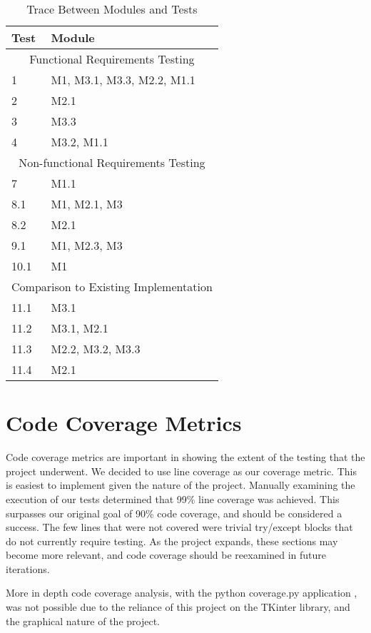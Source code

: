 \documentclass[12pt, titlepage]{article}
\begin{document}
\begin{table}[H!]
\centering
\begin{tabular}{p{} p{}}
\toprule
\textbf{Test} & \textbf{Module}\\
\midrule
\multicolumn{2}{c}{Functional Requirements Testing} \\
\midrule
1 & M1, M3.1, M3.3, M2.2, M1.1 \\
2 & M2.1 \\
3 & M3.3 \\
4 & M3.2, M1.1 \\
\midrule
\multicolumn{2}{c}{Non-functional Requirements Testing} \\
\midrule
7 & M1.1\\
8.1 & M1, M2.1, M3\\
8.2 & M2.1\\
9.1 &  M1, M2.3, M3\\
10.1 & M1\\
\midrule
\multicolumn{2}{c}{Comparison to Existing Implementation} \\
\midrule
11.1 & M3.1\\
11.2 & M3.1, M2.1\\
11.3 & M2.2, M3.2, M3.3 \\
11.4 & M2.1\\
\bottomrule
\end{tabular}
\caption{Trace Between Modules and Tests}
\end{table}
		

\section{Code Coverage Metrics}
Code coverage metrics are important in showing the extent of the testing that the project underwent. We decided to use line coverage as our coverage metric. This is easiest to implement given the nature of the project. Manually examining the execution of our tests determined that 99\% line coverage was achieved. This surpasses our original goal of 90\% code coverage, and should be considered a success. The few lines that were not covered were trivial try/except blocks that do not currently require testing. As the project expands, these sections may become more relevant, and code coverage should be reexamined in future iterations. 

More in depth code coverage analysis, with the python coverage.py application , was not possible due to the reliance of this project on the TKinter library, and the graphical nature of the project.


\end{document}
